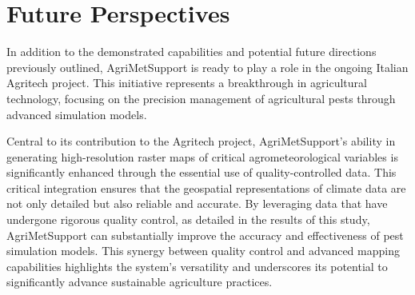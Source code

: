 \documentclass[authoryear,preprint,review,12pt]{elsarticle}
\newcommand{\note}[1]{\emph{\textcolor{red}{#1}}}
\begin{document}







\section*{Future Perspectives}
In addition to the demonstrated capabilities and potential future directions previously outlined, AgriMetSupport is ready to play a role in the ongoing Italian Agritech project. 
This initiative represents a breakthrough in agricultural technology, focusing on the precision management of agricultural pests through advanced simulation models.

Central to its contribution to the Agritech project, AgriMetSupport's ability in generating high-resolution raster maps of critical agrometeorological variables is significantly enhanced through the essential use of quality-controlled data.
This critical integration ensures that the geospatial representations of climate data are not only detailed but also reliable and accurate. 
By leveraging data that have undergone rigorous quality control, as detailed in the results of this study, AgriMetSupport can substantially improve the accuracy and effectiveness of pest simulation models. 
This synergy between quality control and advanced mapping capabilities highlights the system's versatility and underscores its potential to significantly advance sustainable agriculture practices.
\end{document}

